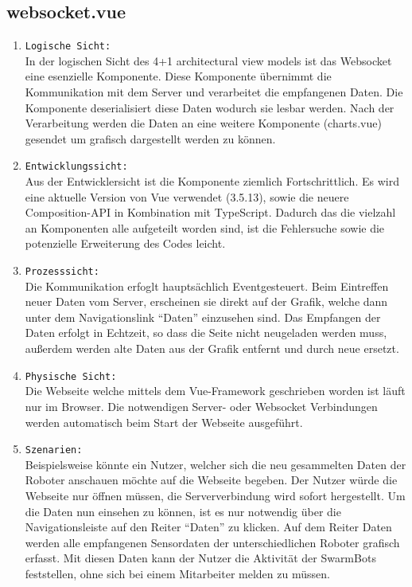 \subsection{websocket.vue}
\label{subsec:frontend_websocket.vue}

\begin{enumerate}
  \item \texttt{Logische Sicht:} \\
  In der logischen Sicht des 4+1 architectural view models ist das Websocket eine esenzielle Komponente.
  Diese Komponente übernimmt die Kommunikation mit dem Server und verarbeitet die empfangenen Daten.
  Die Komponente deserialisiert diese Daten wodurch sie lesbar werden. Nach der Verarbeitung werden die Daten an 
  eine weitere Komponente (charts.vue) gesendet um grafisch dargestellt werden zu können.
  \item \texttt{Entwicklungssicht:} \\
  Aus der Entwicklersicht ist die Komponente ziemlich Fortschrittlich.
  Es wird eine aktuelle Version von Vue verwendet (3.5.13), sowie die neuere Composition-API in Kombination mit TypeScript.
  Dadurch das die vielzahl an Komponenten alle aufgeteilt worden sind,
  ist die Fehlersuche sowie die potenzielle Erweiterung des Codes leicht.
  \item \texttt{Prozesssicht:} \\
  Die Kommunikation erfoglt hauptsächlich Eventgesteuert. 
  Beim Eintreffen neuer Daten vom Server, erscheinen sie direkt auf der Grafik, 
  welche dann unter dem Navigationslink ``Daten'' einzusehen sind. 
  Das Empfangen der Daten erfolgt in Echtzeit, so dass die Seite nicht neugeladen werden muss, 
  außerdem werden alte Daten aus der Grafik entfernt und durch neue ersetzt.
  \item \texttt{Physische Sicht:} \\
  Die Webseite welche mittels dem Vue-Framework geschrieben worden ist läuft nur im Browser.
  Die notwendigen Server- oder Websocket Verbindungen werden automatisch beim Start der Webseite ausgeführt.
  \item \texttt{Szenarien:} \\
  Beispielsweise könnte ein Nutzer, welcher sich die neu gesammelten Daten der Roboter anschauen möchte auf die Webseite begeben.
  Der Nutzer würde die Webseite nur öffnen müssen, die Serververbindung wird sofort hergestellt.
  Um die Daten nun einsehen zu können, ist es nur notwendig über die Navigationsleiste auf den Reiter ``Daten'' zu klicken.
  Auf dem Reiter Daten werden alle empfangenen Sensordaten der unterschiedlichen Roboter grafisch erfasst.
  Mit diesen Daten kann der Nutzer die Aktivität der SwarmBots feststellen, 
  ohne sich bei einem Mitarbeiter melden zu müssen.
\end{enumerate}

